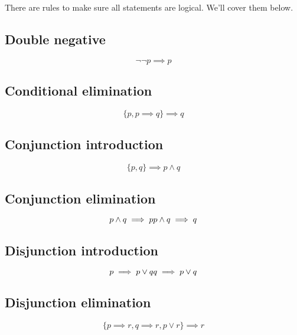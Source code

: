 \documentclass[a4paper,10pt]{report}
\begin{document}
There are rules to make sure all statements are logical. We'll cover them below.

\subsection{Double negative}
\begin{equation*}
 \lnot\lnot p \implies p
\end{equation*}

\subsection{Conditional elimination}
\begin{equation*}
 \{p, p \implies q\} \implies q
\end{equation*}

\subsection{Conjunction introduction}

\begin{equation*}
 \{p, q\} \implies p \land q
\end{equation*}

\subsection{Conjunction elimination}

\begin{equation*}
 p \land q \implies p \\
 p \land q \implies q
\end{equation*}

\subsection{Disjunction introduction}

\begin{equation*}
 p \implies p \lor q \\
 q \implies p \lor q
\end{equation*}

\subsection{Disjunction elimination}

\begin{equation*}
 \{p \implies r, q \implies r, p \lor r\} \implies r
\end{equation*}
\end{document}
